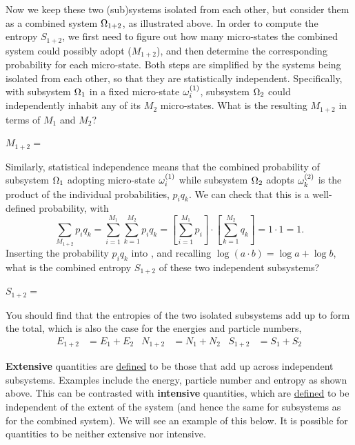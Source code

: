 Now we keep these two (sub)systems isolated from each other, but consider them as a combined system $\Omega_{1+2}$, as illustrated above.
In order to compute the entropy $S_{1+2}$, we first need to figure out how many micro-states the combined system could possibly adopt ($M_{1+2}$), and then determine the corresponding probability for each micro-state.
Both steps are simplified by the systems being isolated from each other, so that they are statistically independent.
Specifically, with subsystem $\Omega_1$ in a fixed micro-state $\omega_i^{(1)}$, subsystem $\Omega_2$ could independently inhabit any of its $M_2$ micro-states.
What is the resulting $M_{1+2}$ in terms of $M_1$ and $M_2$?
\begin{mdframed}
  $M_{1+2} = $ \\[50 pt]
\end{mdframed}
Similarly, statistical independence means that the combined probability of subsystem $\Omega_1$ adopting micro-state $\omega_i^{(1)}$ while subsystem $\Omega_2$ adopts $\omega_k^{(2)}$ is the product of the individual probabilities, $p_i q_k$.
We can check that this is a well-defined probability, with
\begin{equation*}
  \sum_{M_{1+2}} p_i q_k = \sum_{i = 1}^{M_1} \sum_{k = 1}^{M_2} p_i q_k = \left[\sum_{i = 1}^{M_1} p_i\right]\cdot \left[\sum_{k = 1}^{M_2} q_k\right] = 1\cdot 1 = 1.
\end{equation*}
Inserting the probability $p_i q_k$ into , and recalling $\log(a\cdot b) = \log a + \log b$, what is the combined entropy $S_{1+2}$ of these two independent subsystems?
\begin{mdframed}
  $S_{1+2} = $ \\[100 pt]
\end{mdframed}
You should find that the entropies of the two isolated subsystems add up to form the total, which is also the case for the energies and particle numbers,
\begin{align*}
  E_{1+2} & = E_1 + E_2 &
  N_{1+2} & = N_1 + N_2 &
  S_{1+2} & = S_1 + S_2
\end{align*}

\begin{shaded}
  \textbf{Extensive} quantities are \href{https://goldbook.iupac.org/terms/view/E02281}{defined} to be those that add up across independent subsystems.
  Examples include the energy, particle number and entropy as shown above.
  This can be contrasted with \textbf{intensive} quantities, which are \href{https://goldbook.iupac.org/terms/view/I03074}{defined} to be independent of the extent of the system (and hence the same for subsystems as for the combined system).
  We will see an example of this below. %
  It is possible for quantities to be neither extensive nor intensive.
\end{shaded}

